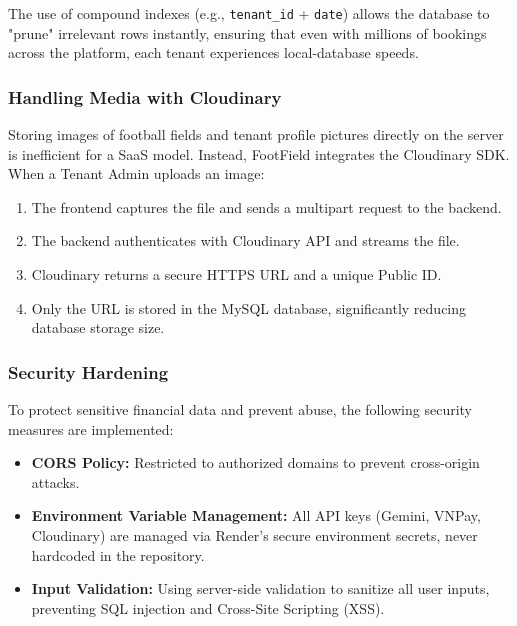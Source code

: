 The use of compound indexes (e.g., \texttt{tenant\_id} + \texttt{date}) allows the database to "prune" irrelevant rows instantly, ensuring that even with millions of bookings across the platform, each tenant experiences local-database speeds.

\subsubsection{Handling Media with Cloudinary}
Storing images of football fields and tenant profile pictures directly on the server is inefficient for a SaaS model. Instead, FootField integrates the Cloudinary SDK. When a Tenant Admin uploads an image:
\begin{enumerate}
    \item The frontend captures the file and sends a multipart request to the backend.
    \item The backend authenticates with Cloudinary API and streams the file.
    \item Cloudinary returns a secure HTTPS URL and a unique Public ID.
    \item Only the URL is stored in the MySQL database, significantly reducing database storage size.
\end{enumerate}

\subsubsection{Security Hardening}
To protect sensitive financial data and prevent abuse, the following security measures are implemented:
\begin{itemize}
    \item \textbf{CORS Policy:} Restricted to authorized domains to prevent cross-origin attacks.
    \item \textbf{Environment Variable Management:} All API keys (Gemini, VNPay, Cloudinary) are managed via Render's secure environment secrets, never hardcoded in the repository.
    \item \textbf{Input Validation:} Using server-side validation to sanitize all user inputs, preventing SQL injection and Cross-Site Scripting (XSS).
\end{itemize}

